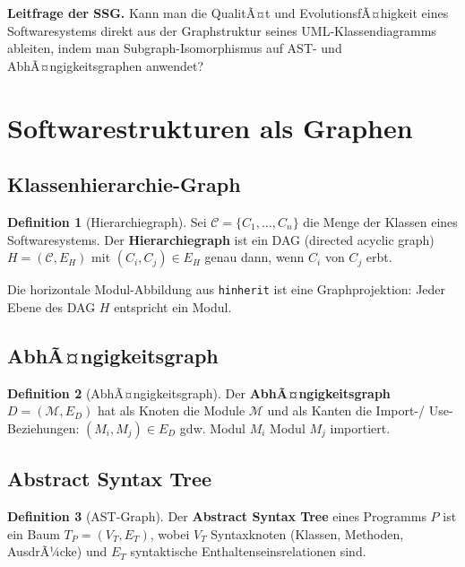 ﻿\documentclass[a4paper,12pt]{scrreprt}
\theoremstyle{definition}
\newtheorem{definition}{Definition}[section]
\begin{document}
\begin{infobox}
\textbf{Leitfrage der SSG.}
Kann man die QualitÃ¤t und EvolutionsfÃ¤higkeit eines Softwaresystems
direkt aus der Graphstruktur seines UML-Klassendiagramms ableiten,
indem man Subgraph-Isomorphismus auf AST- und AbhÃ¤ngigkeitsgraphen
anwendet?
\end{infobox}

\section{Softwarestrukturen als Graphen}

\subsection{Klassenhierarchie-Graph}

\begin{definition}[Hierarchiegraph]
  Sei $\mathcal{C} = \{C_1,\ldots,C_n\}$ die Menge der Klassen eines
  Softwaresystems. Der \textbf{Hierarchiegraph} ist ein DAG (directed
  acyclic graph) $H = (\mathcal{C}, E_H)$ mit $(C_i, C_j) \in E_H$
  genau dann, wenn $C_i$ von $C_j$ erbt.
\end{definition}

Die horizontale Modul-Abbildung aus \texttt{hinherit} ist eine
Graphprojektion: Jeder Ebene des DAG $H$ entspricht ein Modul.

\subsection{AbhÃ¤ngigkeitsgraph}

\begin{definition}[AbhÃ¤ngigkeitsgraph]
  Der \textbf{AbhÃ¤ngigkeitsgraph} $D = (\mathcal{M}, E_D)$ hat als
  Knoten die Module $\mathcal{M}$ und als Kanten die Import-/
  Use-Beziehungen: $(M_i, M_j) \in E_D$ gdw. Modul $M_i$ Modul
  $M_j$ importiert.
\end{definition}

\subsection{Abstract Syntax Tree}

\begin{definition}[AST-Graph]
  Der \textbf{Abstract Syntax Tree} eines Programms $P$ ist ein Baum
  $T_P = (V_T, E_T)$, wobei $V_T$ Syntaxknoten (Klassen, Methoden,
  AusdrÃ¼cke) und $E_T$ syntaktische Enthaltenseinsrelationen sind.
\end{definition}
\end{document}
